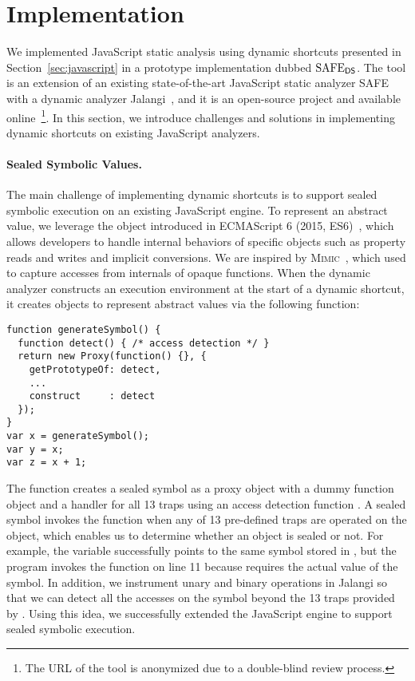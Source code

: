 \section{Implementation}\label{sec:implementation}
We implemented JavaScript static analysis using dynamic shortcuts
presented in Section~\ref{sec:javascript} in a prototype implementation dubbed
$\text{SAFE}_{\textsf{DS}}$.  The tool is an extension of an existing state-of-the-art JavaScript
static analyzer SAFE~\cite{safe, safe2} with a dynamic analyzer
Jalangi~\cite{jalangi}, and it is an open-source project and available online~\footnote{The
URL of the tool is anonymized due to a double-blind review process.}.  In this
section, we introduce challenges and solutions in implementing dynamic
shortcuts on existing JavaScript analyzers.

\paragraph{Sealed Symbolic Values.}
The main challenge of implementing dynamic shortcuts is to support sealed
symbolic execution on an existing JavaScript engine.  To represent an abstract
value, we leverage the  object introduced in ECMAScript 6
(2015, ES6)~\cite{es6}, which allows developers to handle internal behaviors
of specific objects such as property reads and writes and implicit conversions.
We are inspired by \textsc{Mimic}~\cite{mimic}, which used  to
capture accesses from internals of opaque functions.  When the dynamic analyzer
constructs an execution environment at the start of a dynamic shortcut, it
creates  objects to represent abstract values via the
following  function:
\begin{lstlisting}[style=myJSstyle]
function generateSymbol() {
  function detect() { /* access detection */ }
  return new Proxy(function() {}, {
    getPrototypeOf: detect,
    ...
    construct     : detect
  });
}
var x = generateSymbol();
var y = x;
var z = x + 1;
\end{lstlisting}
The function creates a sealed symbol as a proxy object with a dummy
function object and a handler for all 13 traps using an access detection
function .  A sealed symbol invokes the function 
when any of 13 pre-defined traps are operated on the object, which enables us to
determine whether an object is sealed or not.  For example, the variable
 successfully points to the same symbol stored in , but the
program invokes the function  on line 11 because  requires
the actual value of the symbol.  In addition, we instrument unary and binary
operations in Jalangi so that we can detect all the accesses on the
symbol beyond the 13 traps provided by .
Using this idea, we successfully extended the
JavaScript engine to support sealed symbolic execution.

